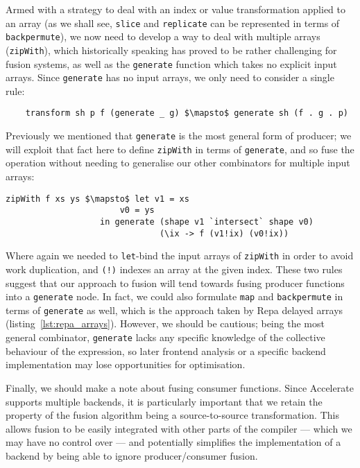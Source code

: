 Armed with a strategy to deal with an index or value transformation applied to
an array (as we shall see, \texttt{slice} and \texttt{replicate} can be
represented in terms of \texttt{backpermute}), we now need to develop a way to
deal with multiple arrays (\texttt{zipWith}), which historically speaking has
proved to be rather challenging for fusion systems, as well as the
\texttt{generate} function which takes no explicit input arrays. Since
\texttt{generate} has no input arrays, we only need to consider a single rule:
%
\begin{lstlisting}[style=haskell,numbers=none,mathescape]
%\bf$\langle$ RULE: generate/transform $\rangle$%
    transform sh p f (generate _ g) $\mapsto$ generate sh (f . g . p)
\end{lstlisting}
%
Previously we mentioned that \texttt{generate} is the most general form of
producer; we will exploit that fact here to define \texttt{zipWith} in
terms of \texttt{generate}, and so fuse the operation without needing to
generalise our other combinators for multiple input arrays:
%
\begin{lstlisting}[style=haskell,numbers=none,mathescape]
zipWith f xs ys $\mapsto$ let v1 = xs
                       v0 = ys
                   in generate (shape v1 `intersect` shape v0)
                               (\ix -> f (v1!ix) (v0!ix))
\end{lstlisting}
%
Where again we needed to \texttt{let}-bind the input arrays of \texttt{zipWith}
in order to avoid work duplication, and \texttt{(!)} indexes an array at the
given index. These two rules suggest that our approach to fusion will tend
towards fusing producer functions into a \texttt{generate} node. In fact, we
could also formulate \texttt{map} and \texttt{backpermute} in terms of
\texttt{generate} as well, which is the approach taken by Repa delayed arrays
(listing~\ref{lst:repa_arrays}). However, we should be cautious; being the most
general combinator, \texttt{generate} lacks any specific knowledge of the
collective behaviour of the expression, so later frontend analysis or a specific
backend implementation may lose opportunities for optimisation.

Finally, we should make a note about fusing consumer functions. Since Accelerate
supports multiple backends, it is particularly important that we retain the
property of the fusion algorithm being a source-to-source transformation. This
allows fusion to be easily integrated with other parts of the compiler --- which
we may have no control over --- and potentially simplifies the implementation of
a backend by being able to ignore producer/consumer fusion.


